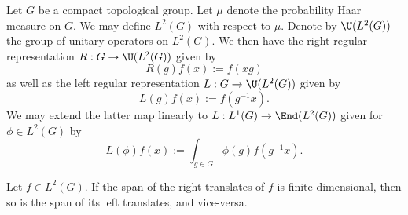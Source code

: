 \documentclass[reqno]{amsart} 
\begin{document}

Let $G$ be a compact topological group.
Let $\mu$ denote the probability Haar measure on $G$.
We may define $L^2(G)$ with respect to $\mu$.
Denote by $\U(L^2(G))$ the group of unitary operators on $L^2(G)$.
We then have
the right regular representation $R : G \rightarrow \U(L^2(G))$
given by
\begin{equation*}
R(g) f(x) := f(x g)
\end{equation*}
as well as
the left regular representation $L : G \rightarrow \U(L^2(G))$
given by
\begin{equation*}
L(g) f(x) := f(g^{-1} x).
\end{equation*}
We may extend the latter map linearly
to $L : L^1(G) \rightarrow \End(L^2(G))$
given for $\phi \in L^2(G)$
by
\begin{equation*}
L(\phi) f(x) := \int_{g \in G} \phi(g) f(g^{-1} x).
\end{equation*}
\begin{lemma}\label{lem:right-finite-implies-left-finite}
  Let $f \in L^2(G)$.
  If the span of the right translates of $f$
  is finite-dimensional,
  then so is the span of its left translates, and vice-versa.
\end{lemma}
\end{document}
